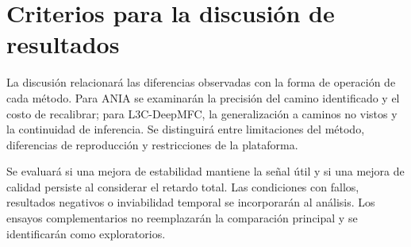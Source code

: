 \section{Criterios para la discusión de resultados}
La discusión relacionará las diferencias observadas con la forma de operación de cada método. Para ANIA se examinarán la precisión del camino identificado y el costo de recalibrar; para L3C-DeepMFC, la generalización a caminos no vistos y la continuidad de inferencia. Se distinguirá entre limitaciones del método, diferencias de reproducción y restricciones de la plataforma.

Se evaluará si una mejora de estabilidad mantiene la señal útil y si una mejora de calidad persiste al considerar el retardo total. Las condiciones con fallos, resultados negativos o inviabilidad temporal se incorporarán al análisis. Los ensayos complementarios no reemplazarán la comparación principal y se identificarán como exploratorios.
